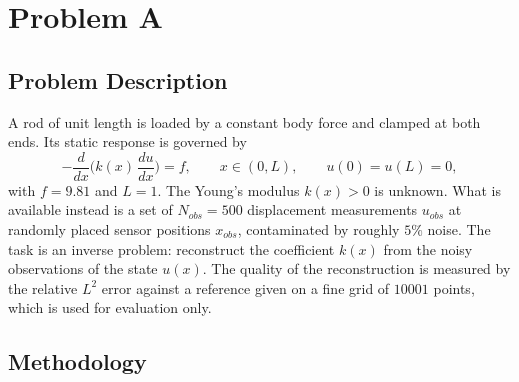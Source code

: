 
\chapter{Problem A}
\label{ch:problem_A}
%
\section{Problem Description}
A rod of unit length is loaded by a constant body force and clamped at both
ends. Its static response is governed by
\begin{equation}
    -\frac{d}{dx}\Big(k(x)\,\frac{du}{dx}\Big) = f, \qquad x \in (0,L),
    \qquad u(0) = u(L) = 0,
    \label{eq:A_pde}
\end{equation}
with $f = 9.81$ and $L = 1$. The Young's modulus $k(x) > 0$ is unknown. What
is available instead is a set of $N_{obs} = 500$ displacement measurements
$u_{obs}$ at randomly placed sensor positions $x_{obs}$, contaminated by
roughly $5\%$ noise. The task is an inverse problem: reconstruct the
coefficient $k(x)$ from the noisy observations of the state $u(x)$. The
quality of the reconstruction is measured by the relative $L^2$ error
against a reference given on a fine grid of $10001$ points, which is used
for evaluation only.
%
\section{Methodology}
%
